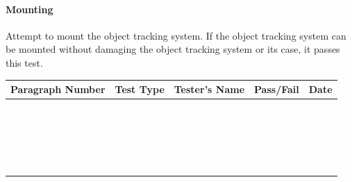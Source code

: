 \paragraph{Mounting}
Attempt to mount the object tracking system. If the object tracking system can be mounted without damaging the object tracking system or its case, it passes this test. 


%

\begin{table}[h]
\centering
\begin{tabular}{|c|c|C{6cm}|c|c|}
\hline
\textbf{Paragraph Number} & \textbf{Test Type}& 
\textbf{Tester's Name} & \textbf{Pass/Fail} & \textbf{Date} \\
\hline
 & & & & \\
\hline
 & & & & \\
\hline
 & & & & \\
\hline
 & & & & \\
\hline
 & & & & \\
\hline
 & & & & \\
\hline
 & & & & \\
\hline
 & & & & \\
\hline
 & & & & \\
\hline
 & & & & \\
\hline
 & & & & \\
\hline
 & & & & \\
\hline
 & & & & \\
\hline
 & & & & \\
\hline
 & & & & \\
\hline
 & & & & \\
\hline
 & & & & \\
\hline
 & & & & \\
\hline
 & & & & \\
\hline
 & & & & \\
\hline
 & & & & \\
\hline
\end{tabular}
\end{table}
%
%
